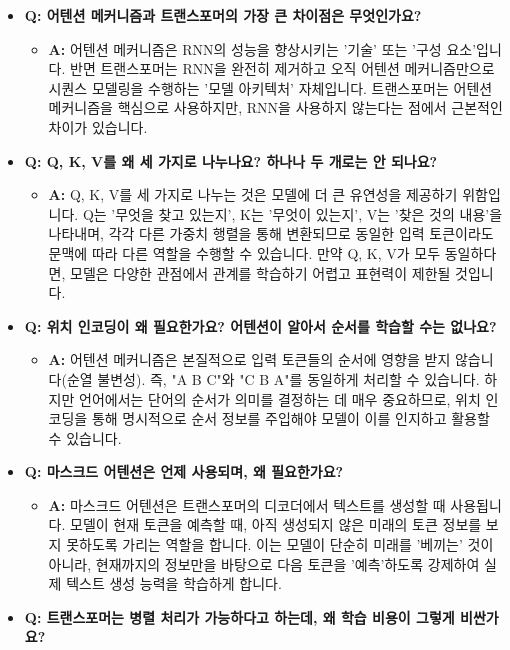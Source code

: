 \documentclass[11pt,a4paper]{article}
\begin{document}
\begin{itemize}
    \item \textbf{Q: 어텐션 메커니즘과 트랜스포머의 가장 큰 차이점은 무엇인가요?}
    \begin{itemize}
        \item \textbf{A:} 어텐션 메커니즘은 RNN의 성능을 향상시키는 '기술' 또는 '구성 요소'입니다. 반면 트랜스포머는 RNN을 완전히 제거하고 오직 어텐션 메커니즘만으로 시퀀스 모델링을 수행하는 '모델 아키텍처' 자체입니다. 트랜스포머는 어텐션 메커니즘을 핵심으로 사용하지만, RNN을 사용하지 않는다는 점에서 근본적인 차이가 있습니다.
    \end{itemize}
    \item \textbf{Q: Q, K, V를 왜 세 가지로 나누나요? 하나나 두 개로는 안 되나요?}
    \begin{itemize}
        \item \textbf{A:} Q, K, V를 세 가지로 나누는 것은 모델에 더 큰 유연성을 제공하기 위함입니다. Q는 '무엇을 찾고 있는지', K는 '무엇이 있는지', V는 '찾은 것의 내용'을 나타내며, 각각 다른 가중치 행렬을 통해 변환되므로 동일한 입력 토큰이라도 문맥에 따라 다른 역할을 수행할 수 있습니다. 만약 Q, K, V가 모두 동일하다면, 모델은 다양한 관점에서 관계를 학습하기 어렵고 표현력이 제한될 것입니다.
    \end{itemize}
    \item \textbf{Q: 위치 인코딩이 왜 필요한가요? 어텐션이 알아서 순서를 학습할 수는 없나요?}
    \begin{itemize}
        \item \textbf{A:} 어텐션 메커니즘은 본질적으로 입력 토큰들의 순서에 영향을 받지 않습니다(순열 불변성). 즉, "A B C"와 "C B A"를 동일하게 처리할 수 있습니다. 하지만 언어에서는 단어의 순서가 의미를 결정하는 데 매우 중요하므로, 위치 인코딩을 통해 명시적으로 순서 정보를 주입해야 모델이 이를 인지하고 활용할 수 있습니다.
    \end{itemize}
    \item \textbf{Q: 마스크드 어텐션은 언제 사용되며, 왜 필요한가요?}
    \begin{itemize}
        \item \textbf{A:} 마스크드 어텐션은 트랜스포머의 디코더에서 텍스트를 생성할 때 사용됩니다. 모델이 현재 토큰을 예측할 때, 아직 생성되지 않은 미래의 토큰 정보를 보지 못하도록 가리는 역할을 합니다. 이는 모델이 단순히 미래를 '베끼는' 것이 아니라, 현재까지의 정보만을 바탕으로 다음 토큰을 '예측'하도록 강제하여 실제 텍스트 생성 능력을 학습하게 합니다.
    \end{itemize}
    \item \textbf{Q: 트랜스포머는 병렬 처리가 가능하다고 하는데, 왜 학습 비용이 그렇게 비싼가요?}

\end{itemize}
\end{document}
